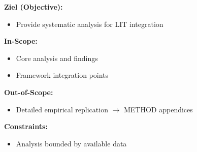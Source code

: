\documentclass[11pt,a4paper]{article}
\begin{document}

\begin{abstract}
This appendix establishes the Quality Assessment Framework for EBF, distinguishing \emph{template compliance} (formal structure) from \emph{content quality} (scientific substance). The TERAN framework—assessing Theory, Evidence, Rigor, Applicability, and Transparency—is derived from the peer-reviewed Quality Assessment Framework (QAF) of Belcher et al.\ (2016), supplemented by the TACT framework (2023), Glassick Criteria (1997), and Guba's naturalistic evaluation criteria (1981). We define five epistemic status tags (EMP, THR, LLM, ILL, HYP) to ensure transparency about the evidential basis of all claims and parameters. The framework enables systematic quality tracking and provides actionable guidance for improving EBF documentation toward publication readiness.
\end{abstract}




\begin{tcolorbox}[
    colback=orange!5!white,
    colframe=orange!75!black,
    title={\textbf{Appendix Scope: Ziel / In-Scope / Out-of-Scope / Constraints}},
    fonttitle=\bfseries
]

\textbf{Ziel (Objective):}
\begin{itemize}[nosep]
    \item Provide systematic analysis for LIT integration
\end{itemize}

\textbf{In-Scope:}
\begin{itemize}[nosep]
    \item Core analysis and findings
    \item Framework integration points
\end{itemize}

\textbf{Out-of-Scope:}
\begin{itemize}[nosep]
    \item Detailed empirical replication $\rightarrow$ METHOD appendices
\end{itemize}

\textbf{Constraints:}
\begin{itemize}[nosep]
    \item Analysis bounded by available data
\end{itemize}

\end{tcolorbox}
\end{document}
